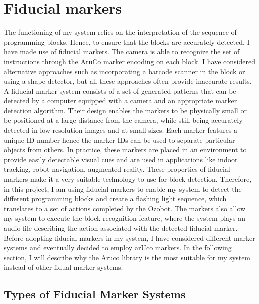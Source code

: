 \documentclass[oneside,%
                    author={Malak Hajji},
                    degree={BSc},
                    title={Designing An Accessible Computational Toolkit For Students},
                  subtitle={With Mixed Visual Abilities}]{dissertation}
\begin{document}
\section{Fiducial markers}
\noindent
The functioning of my system relies on the interpretation of the sequence of programming blocks. Hence, to ensure that the blocks are accurately detected, I have made use of fiducial markers. The camera is able to recognize the set of instructions through the AruCo marker encoding on each block. 
I have considered alternative approaches such as incorporating a barcode scanner in the block or using a shape detector, but all these approaches often provide inaccurate results. 
A fiducial marker system consists of a set of generated patterns that can be detected by a computer equipped with a camera and an appropriate marker detection algorithm.  Their design enables the markers to be physically small or be positioned at a large distance from the camera, while still being accurately detected in low-resolution images and at small sizes. Each marker features a unique ID number hence the marker IDs can be used to separate particular objects from others. In practice, these markers are placed in an environment to provide easily detectable visual cues and are used in applications like indoor tracking, robot navigation, augmented reality. These properties of fiducial markers make it a very suitable technology to use for block detection. 
Therefore, in this project, I am using fiducial markers to enable my system to detect the different programming blocks and create a flashing light sequence, which translates to a set of actions completed by the Ozobot. The markers also allow my system to execute the block recognition feature, where the system plays an audio file describing the action associated with the detected fiducial marker.  Before adopting fiducial markers in my system, I have considered different marker systems and eventually decided to employ arUco markers. In the following section, I will describe why the Aruco library is the most suitable for my system instead of other fidual marker systems.

\subsection{Types of Fiducial Marker Systems}
\subsubsection{}
\end{document}
